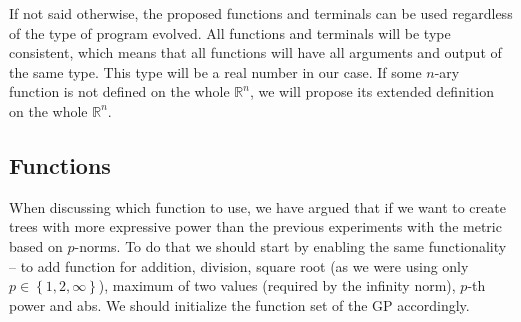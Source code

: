  If not said otherwise, the proposed functions and terminals can be used regardless of the type of program evolved. All functions and terminals will be type consistent, which means that all functions will have all arguments and output of the same type. This type will be a real number in our case. If some $n$-ary function is not defined on the whole $\mathbb{R}^n$, we will propose its extended definition on the whole $\mathbb{R}^n$.
 
 \subsection{Functions}
 When discussing which function to use, we have argued that if we want to create trees with more expressive power than the previous experiments with the metric based on $p$-norms. To do that we should start by enabling the same functionality -- to add function for addition, division, square root (as we were using only $p \in \left\{1, 2, \infty  \right\}$), maximum of two values (required by the infinity norm), $p$-th power and abs. We should initialize the function set of the GP accordingly. 
 
